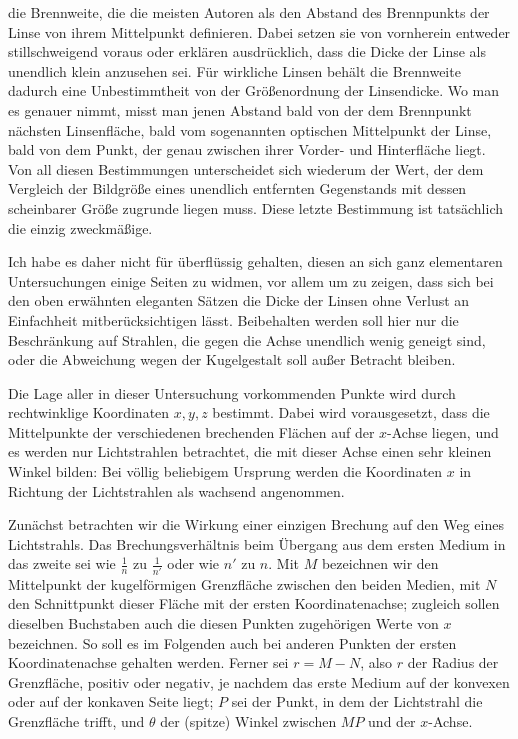 die Brennweite, die die meisten Autoren als den Abstand des Brennpunkts der Linse von ihrem Mittelpunkt definieren. Dabei setzen sie von vornherein entweder stillschweigend voraus oder erklären ausdrücklich, dass die Dicke der Linse als unendlich klein anzusehen sei. Für wirkliche Linsen behält die Brennweite dadurch eine Unbestimmtheit von der Größenordnung der Linsendicke. Wo man es genauer nimmt, misst man jenen Abstand bald von der dem Brennpunkt nächsten Linsenfläche, bald vom sogenannten optischen Mittelpunkt der Linse, bald von dem Punkt, der genau zwischen ihrer Vorder- und Hinterfläche liegt. Von all diesen Bestimmungen unterscheidet sich wiederum der Wert, der dem Vergleich der Bildgröße eines unendlich entfernten Gegenstands mit dessen scheinbarer Größe zugrunde liegen muss. Diese letzte Bestimmung ist tatsächlich die einzig zweckmäßige.

Ich habe es daher nicht für überflüssig gehalten, diesen an sich ganz elementaren Untersuchungen einige Seiten zu widmen, vor allem um zu zeigen, dass sich bei den oben erwähnten eleganten Sätzen die Dicke der Linsen ohne Verlust an Einfachheit mitberücksichtigen lässt. Beibehalten werden soll hier nur die Beschränkung auf Strahlen, die gegen die Achse unendlich wenig geneigt sind, oder die Abweichung wegen der Kugelgestalt soll außer Betracht bleiben.

Die Lage aller in dieser Untersuchung vorkommenden Punkte wird durch rechtwinklige Koordinaten $x,y,z$ bestimmt. Dabei wird vorausgesetzt, dass die Mittelpunkte der verschiedenen brechenden Flächen auf der $x$-Achse liegen, und es werden nur Lichtstrahlen betrachtet, die mit dieser Achse einen sehr kleinen Winkel bilden: Bei völlig beliebigem Ursprung werden die Koordinaten $x$ in Richtung der Lichtstrahlen als wachsend angenommen.

Zunächst betrachten wir die Wirkung einer einzigen Brechung auf den Weg eines Lichtstrahls. Das Brechungsverhältnis beim Übergang aus dem ersten Medium in das zweite sei wie $\frac1n$ zu $\frac1{n'}$ oder wie $n'$ zu $n$. Mit $M$ bezeichnen wir den Mittelpunkt der kugelförmigen Grenzfläche zwischen den beiden Medien, mit $N$ den Schnittpunkt dieser Fläche mit der ersten Koordinatenachse; zugleich sollen dieselben Buchstaben auch die diesen Punkten zugehörigen
Werte von $x$ bezeichnen. So soll es im Folgenden auch bei anderen Punkten der ersten Koordinatenachse gehalten werden. Ferner sei $r=M-N$, also $r$ der Radius der Grenzfläche, positiv oder negativ, je nachdem das erste Medium auf der konvexen oder auf der konkaven Seite liegt; $P$ sei der Punkt, in dem der Lichtstrahl die Grenzfläche trifft, und $\theta$ der (spitze) Winkel zwischen $MP$ und der $x$-Achse.


